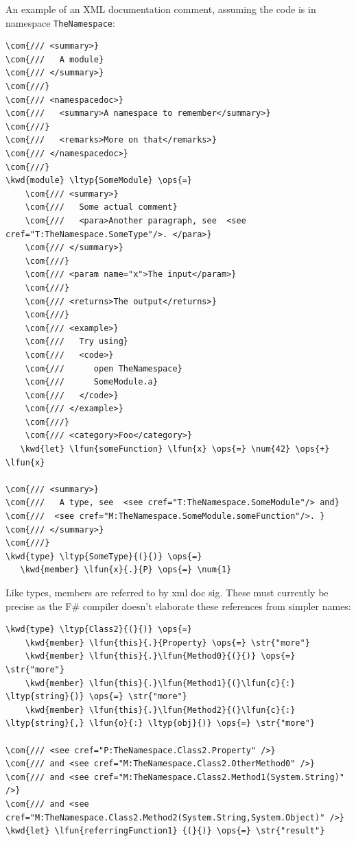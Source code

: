 \documentclass{article}
\newcommand{\com}[1]{\textcolor{officegreen}{#1}}
\newcommand{\kwd}[1]{\textcolor{navy}{#1}}
\newcommand{\num}[1]{\textcolor{officegreen}{#1}}
\newcommand{\ops}[1]{\textcolor{purple}{#1}}
\newcommand{\str}[1]{\textcolor{olive}{#1}}
\begin{document}
An example of an XML documentation comment, assuming the code is in namespace \texttt{TheNamespace}:
\begin{Verbatim}[commandchars=\\\{\}]
\com{/// <summary>}
\com{///   A module}
\com{/// </summary>}
\com{///}
\com{/// <namespacedoc>}
\com{///   <summary>A namespace to remember</summary>}
\com{///}
\com{///   <remarks>More on that</remarks>}
\com{/// </namespacedoc>}
\com{///}
\kwd{module} \ltyp{SomeModule} \ops{=} 
    \com{/// <summary>}
    \com{///   Some actual comment}
    \com{///   <para>Another paragraph, see  <see cref="T:TheNamespace.SomeType"/>. </para>}
    \com{/// </summary>}
    \com{///}
    \com{/// <param name="x">The input</param>}
    \com{///}
    \com{/// <returns>The output</returns>}
    \com{///}
    \com{/// <example>}
    \com{///   Try using}
    \com{///   <code>}
    \com{///      open TheNamespace}
    \com{///      SomeModule.a}
    \com{///   </code>}
    \com{/// </example>}
    \com{///}
    \com{/// <category>Foo</category>}
   \kwd{let} \lfun{someFunction} \lfun{x} \ops{=} \num{42} \ops{+} \lfun{x}

\com{/// <summary>}
\com{///   A type, see  <see cref="T:TheNamespace.SomeModule"/> and}
\com{///  <see cref="M:TheNamespace.SomeModule.someFunction"/>. }
\com{/// </summary>}
\com{///}
\kwd{type} \ltyp{SomeType}{(}{)} \ops{=}
   \kwd{member} \lfun{x}{.}{P} \ops{=} \num{1}
\end{Verbatim}



Like types, members are referred to by xml doc sig.  These must currently be precise as the F\#
compiler doesn't elaborate these references from simpler names:
\begin{Verbatim}[commandchars=\\\{\}]
\kwd{type} \ltyp{Class2}{(}{)} \ops{=} 
    \kwd{member} \lfun{this}{.}{Property} \ops{=} \str{"more"}
    \kwd{member} \lfun{this}{.}\lfun{Method0}{(}{)} \ops{=} \str{"more"}
    \kwd{member} \lfun{this}{.}\lfun{Method1}{(}\lfun{c}{:} \ltyp{string}{)} \ops{=} \str{"more"}
    \kwd{member} \lfun{this}{.}\lfun{Method2}{(}\lfun{c}{:} \ltyp{string}{,} \lfun{o}{:} \ltyp{obj}{)} \ops{=} \str{"more"}

\com{/// <see cref="P:TheNamespace.Class2.Property" />}
\com{/// and <see cref="M:TheNamespace.Class2.OtherMethod0" />}
\com{/// and <see cref="M:TheNamespace.Class2.Method1(System.String)" />}
\com{/// and <see cref="M:TheNamespace.Class2.Method2(System.String,System.Object)" />}
\kwd{let} \lfun{referringFunction1} {(}{)} \ops{=} \str{"result"}
\end{Verbatim}
\end{document}
